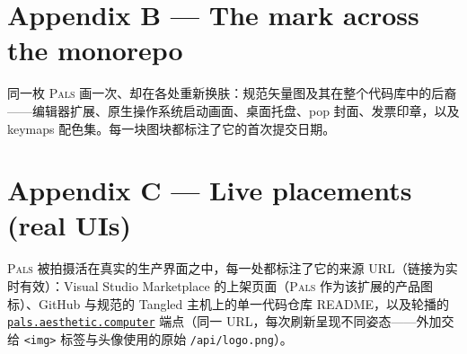 \documentclass[10pt,letterpaper,twocolumn]{article}
\newcommand{\pals}{\textsc{Pals}}
\begin{document}



\newpage
\section*{Appendix B --- The mark across the monorepo}
\noindent 同一枚 \pals{} 画一次、却在各处重新换肤：规范矢量图及其在整个代码库中的后裔——编辑器扩展、原生操作系统启动画面、桌面托盘、pop 封面、发票印章，以及 keymaps 配色集。每一块图块都标注了它的首次提交日期。
\vspace{1.2em}



\newpage
\section*{Appendix C --- Live placements (real UIs)}
\noindent \pals{} 被拍摄活在真实的生产界面之中，每一处都标注了它的来源 URL（链接为实时有效）：Visual Studio Marketplace 的上架页面（\pals{} 作为该扩展的产品图标）、GitHub 与规范的 Tangled 主机上的单一代码仓库 README，以及轮播的 \href{https://pals.aesthetic.computer}{\texttt{pals.aesthetic.computer}} 端点（同一 URL，每次刷新呈现不同姿态——外加交给 \texttt{<img>} 标签与头像使用的原始 \texttt{/api/logo.png}）。
\vspace{1.0em}


\end{document}
